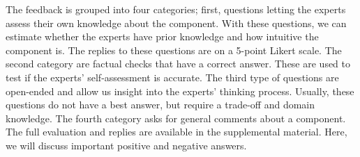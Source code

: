\documentclass{egpubl}
\begin{document}
The feedback is grouped into four categories; first, questions letting the experts assess their own knowledge about the component. With these questions, we can estimate whether the experts have prior knowledge and how intuitive the component is. The replies to these questions are on a 5-point Likert scale. The second category are factual checks that have a correct answer. These are used to test if the experts' self-assessment is accurate. The third type of questions are open-ended and allow us insight into the experts' thinking process. Usually, these questions do not have a best answer, but require a trade-off and domain knowledge. The fourth category asks for general comments about a component. The full evaluation and replies are available in the supplemental material. Here, we will discuss important positive and negative answers. 
\end{document}
